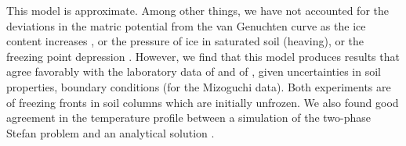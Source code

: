 \documentclass[twoside,10pt]{report}
\begin{document}
This model is approximate. Among other things, we have not accounted for the deviations in the  matric potential from the van Genuchten curve as the ice content increases \citep{KurylykWatanabe2013, WatanabeExperiment}, or the pressure of ice in saturated soil (heaving), or the freezing point depression \citep{dallamico2011}. However, we find that this model produces results that agree favorably with the laboratory data of \citet{Mizoguchi1990} and of \citet{WatanabeExperiment}, given uncertainties in soil properties, boundary conditions (for the Mizoguchi data). Both experiments are of freezing fronts in soil columns which are initially unfrozen. We also found good agreement in the temperature profile between a simulation of the two-phase Stefan problem and an analytical solution \citep{dallamico2011}.
\end{document}
